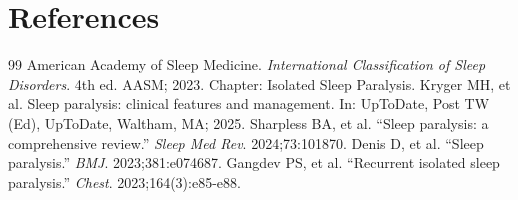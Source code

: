 \section*{References}
\begin{thebibliography}{99}
 American Academy of Sleep Medicine. \emph{International Classification of Sleep Disorders}. 4th ed. AASM; 2023. Chapter: Isolated Sleep Paralysis.
 Kryger MH, et al. Sleep paralysis: clinical features and management. In: UpToDate, Post TW (Ed), UpToDate, Waltham, MA; 2025.
 Sharpless BA, et al. ``Sleep paralysis: a comprehensive review.'' \emph{Sleep Med Rev}. 2024;73:101870.
 Denis D, et al. ``Sleep paralysis.'' \emph{BMJ}. 2023;381:e074687.
 Gangdev PS, et al. ``Recurrent isolated sleep paralysis.'' \emph{Chest}. 2023;164(3):e85-e88.
\end{thebibliography}
